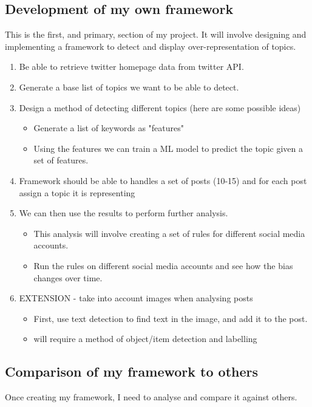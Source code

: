 \documentclass[a4paper,fleqn,10pt]{article}
\begin{document}
\subsection{Development of my own framework}
\label{subsec:framework}
This is the first, and primary, section of my project. It will involve designing and implementing a framework to detect and
display over-representation of topics.
\begin{enumerate}
    \item Be able to retrieve twitter homepage data from twitter API.
    \item Generate a base list of topics we want to be able to detect.
    \item Design a method of detecting different topics (here are some possible ideas)
    \begin{itemize}
        \item Generate a list of keywords as "features"
        \item Using the features we can train a ML model to predict the topic given a set of features.
    \end{itemize}
    \item Framework should be able to handles a set of posts (10-15) and for each post assign a topic it is representing
    \item We can then use the results to perform further analysis.
    \begin{itemize}
        \item This analysis will involve creating a set of rules for different social media accounts.
        \item Run the rules on different social media accounts and see how the bias changes over time.
    \end{itemize}
    \item EXTENSION - take into account images when analysing posts
    \begin{itemize}
        \item First, use text detection to find text in the image, and add it to the post.
        \item will require a method of object/item detection and labelling
    \end{itemize}
\end{enumerate}

\subsection{Comparison of my framework to others}
Once creating my framework, I need to analyse and compare it against others.
\end{document}
